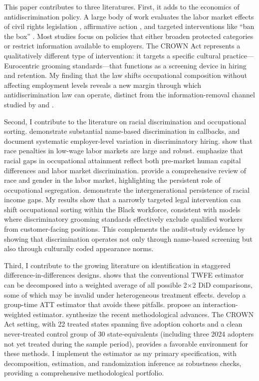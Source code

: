 \documentclass[12pt]{article}
\begin{document}
This paper contributes to three literatures. First, it adds to the economics of antidiscrimination policy. A large body of work evaluates the labor market effects of civil rights legislation \citep{donohue1991, heckman1998}, affirmative action \citep{miller2017}, and targeted interventions like ``ban the box'' \citep{agan2018, doleac2020}. Most studies focus on policies that either broaden protected categories or restrict information available to employers. The CROWN Act represents a qualitatively different type of intervention: it targets a specific cultural practice---Eurocentric grooming standards---that functions as a screening device in hiring and retention. My finding that the law shifts occupational composition without affecting employment levels reveals a new margin through which antidiscrimination law can operate, distinct from the information-removal channel studied by \citet{agan2018} and \citet{doleac2020}.

Second, I contribute to the literature on racial discrimination and occupational sorting. \citet{bertrand2004discrimination} demonstrate substantial name-based discrimination in callbacks, and \citet{kline2022} document systematic employer-level variation in discriminatory hiring. \citet{pager2009} show that race penalties in low-wage labor markets are large and robust. \citet{lang2020} emphasize that racial gaps in occupational attainment reflect both pre-market human capital differences and labor market discrimination. \citet{altonji1999} provide a comprehensive review of race and gender in the labor market, highlighting the persistent role of occupational segregation. \citet{chetty2020} demonstrate the intergenerational persistence of racial income gaps. My results show that a narrowly targeted legal intervention can shift occupational sorting within the Black workforce, consistent with models where discriminatory grooming standards effectively exclude qualified workers from customer-facing positions. This complements the audit-study evidence by showing that discrimination operates not only through name-based screening but also through culturally coded appearance norms.

Third, I contribute to the growing literature on identification in staggered difference-in-differences designs. \citet{goodmanBacon2021} shows that the conventional TWFE estimator can be decomposed into a weighted average of all possible 2$\times$2 DiD comparisons, some of which may be invalid under heterogeneous treatment effects. \citet{callaway2021} develop a group-time ATT estimator that avoids these pitfalls. \citet{sunAbraham2021} propose an interaction-weighted estimator. \citet{roth2023} synthesize the recent methodological advances. The CROWN Act setting, with 22 treated states spanning five adoption cohorts and a clean never-treated control group of 30 state-equivalents (including three 2024 adopters not yet treated during the sample period), provides a favorable environment for these methods. I implement the \citet{callaway2021} estimator as my primary specification, with \citet{goodmanBacon2021} decomposition, \citet{sunAbraham2021} estimation, and randomization inference \citep{bertrand2004} as robustness checks, providing a comprehensive methodological portfolio.
\end{document}
